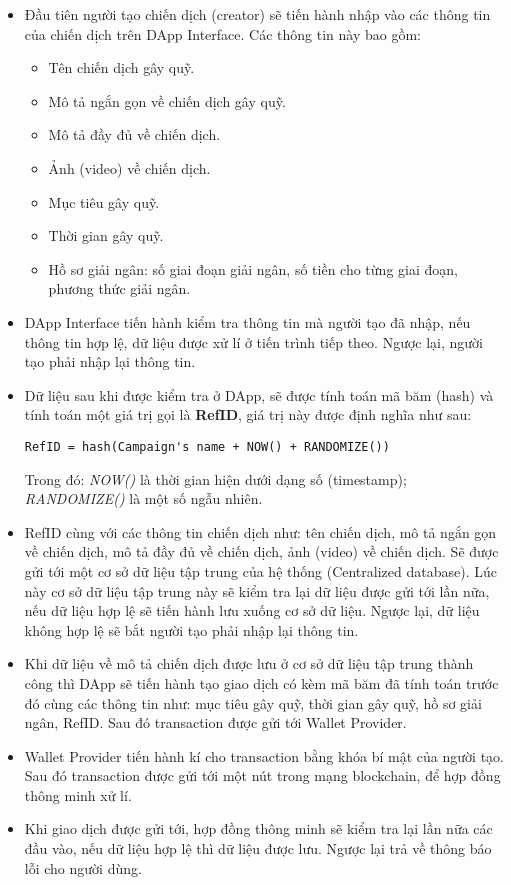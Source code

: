 \documentclass[../main-report.tex]{subfiles}
\begin{document}
\begin{itemize}
\item Đầu tiên người tạo chiến dịch (creator) sẽ tiến hành nhập vào các thông tin của chiến dịch trên DApp Interface. Các thông tin này bao gồm: 
\begin{itemize}
\item Tên chiến dịch gây quỹ.
\item Mô tả ngắn gọn về chiến dịch gây quỹ.
\item Mô tả đầy đủ về chiến dịch.
\item Ảnh (video) về chiến dịch.
\item Mục tiêu gây quỹ.
\item Thời gian gây quỹ.
\item Hồ sơ giải ngân: số giai đoạn giải ngân, số tiền cho từng giai đoạn, phương thức giải ngân.
\end{itemize}
\item DApp Interface tiến hành kiểm tra thông tin mà người tạo đã nhập, nếu thông tin hợp lệ, dữ liệu được xử lí ở tiến trình tiếp theo. Ngược lại, người tạo phải nhập lại thông tin.
\item Dữ liệu sau khi được kiểm tra ở DApp, sẽ được tính toán mã băm (hash) và tính toán một giá trị gọi là \textbf{RefID}, giá trị này được định nghĩa như sau:
\begin{lstlisting} 
RefID = hash(Campaign's name + NOW() + RANDOMIZE())
\end{lstlisting}

Trong đó: \textit{NOW()} là thời gian hiện dưới dạng số (timestamp); \textit{RANDOMIZE()} là một số ngẫu nhiên.
\item RefID cùng với các thông tin chiến dịch như: tên chiến dịch, mô tả ngắn gọn về chiến dịch, mô tả đầy đủ về chiến dịch, ảnh (video) về chiến dịch. Sẽ được gửi tới một cơ sở dữ liệu tập trung của hệ thống (Centralized database). Lúc này cơ sở dữ liệu tập trung này sẽ kiểm tra lại dữ liệu được gửi tới lần nữa, nếu dữ liệu hợp lệ sẽ tiến hành lưu xuống cơ sở dữ liệu. Ngược lại, dữ liệu không hợp lệ sẽ bắt người tạo phải nhập lại thông tin.
\item Khi dữ liệu về mô tả chiến dịch được lưu ở cơ sở dữ liệu tập trung thành công thì DApp sẽ tiến hành tạo giao dịch có kèm mã băm đã tính toán trước đó cùng các thông tin như: mục tiêu gây quỹ, thời gian gây quỹ, hồ sơ giải ngân, RefID. Sau đó transaction được gửi tới Wallet Provider.
\item Wallet Provider tiến hành kí cho \gls{transaction} bằng khóa bí mật của người tạo. Sau đó \gls{transaction} được gửi tới một nút trong mạng blockchain, để hợp đồng thông minh xử lí.
\item Khi giao dịch được gửi tới, hợp đồng thông minh sẽ kiểm tra lại lần nữa các đầu vào, nếu dữ liệu hợp lệ thì dữ liệu được lưu. Ngược lại trả về thông báo lỗi cho người dùng.
\end{itemize}
\end{document}
